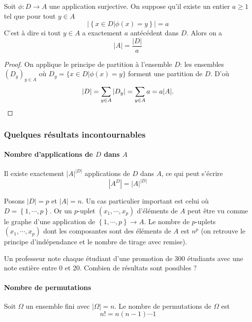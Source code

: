 \begin{proposition}
	Soit $\phi:D \to A$ une application surjective. On suppose qu'il existe un entier $a \geq 1$ tel que pour tout $y\in A$
	\[
		|\left\{ x \in D | \phi(x) =y \right\}| = a
	\]
	C'est à dire si tout $y\in A$ a exactement $a$ antécédent dans $D$. Alors on a 
	\[
		|A| = \frac{|D|}{a}
	\]
\end{proposition}

\begin{proof}
	On applique le principe de partition à l'ensemble $D$: les ensembles $(D_y)_{y\in A}$ où $D_y = \{ x\in D | \phi(x) =y \}$ forment une partition de $D$. D'où
	\[
		|D| = \sum_{y\in A} |D_y| = \sum_{y\in A} a = a |A|. \qedhere
\]
\end{proof}


\subsubsection{Quelques résultats incontournables}

\paragraph{Nombre d'applications de $D$ dans $A$} Il existe exactement $|A|^{|D|}$ applications de $D$ dans $A$, ce qui peut s'écrire 
\[
	|A^D| = |A|^{|D|}
\]

\begin{remark}
	Posons $|D|=p$ et $|A|=n$. Un cas particulier important est celui où $D =\left\{ 1,\cdots,p \right\}$. Or un $p$-uplet $(x_1,\cdots,x_p)$ d'éléments de $A$ peut être vu comme le graphe d'une application de $\left\{ 1,\cdots,p \right\} \to A$. Le nombre de $p$-uplets $(x_1,\cdots,x_p)$ dont les composantes sont des éléments de $A$ est $n^p$ (on retrouve le principe d'indépendance et le nombre de tirage avec remise).
\end{remark}

\begin{exemple}
	Un professeur note chaque étudiant d'une promotion de 300 étudiants avec une note entière entre 0 et 20. Combien de résultats sont possibles ?
\pl{\rep{3cm}}
\end{exemple}
\paragraph{Nombre de permutations} Soit $\Omega$ un ensemble fini avec $|\Omega|=n$. Le nombre de permutations de $\Omega$  est 
\[  n !  = n(n-1)\cdots 1 \]

